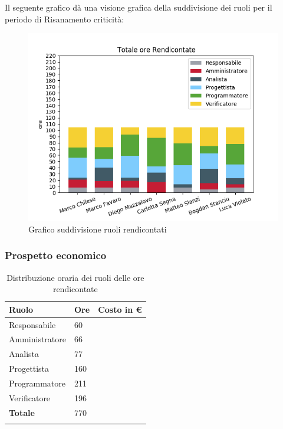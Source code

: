 Il seguente grafico dà una visione grafica della suddivisione dei ruoli per il periodo di Risanamento criticità:%

\begin{figure}[H]
	\centering
  		\includegraphics[width=1\linewidth]{./images/fig_tor.png}
  		\caption{Grafico suddivisione ruoli rendicontati}
  		\label{fig:grafico suddivione ruoli}
\end{figure}


\subsubsection{Prospetto economico}
\begin{longtable}{| C{.30\textwidth}| C{.15\textwidth}| C{.20\textwidth}|}
\hline
\textbf{Ruolo} & \textbf{Ore} & \textbf{Costo in \euro} \\
\hline
Responsabile & 60 &  \\
\hline
Amministratore & 66 &  \\
\hline
Analista & 77 &  \\
\hline
Progettista & 160 & \\
\hline 
Programmatore & 211 &  \\
\hline
Verificatore & 196 &  \\
\hline 
\textbf{Totale} & 770 & \\
\hline

\caption{Distribuzione oraria dei ruoli delle ore rendicontate}
\label{Distribuzione oraria a carico del committente}
\end{longtable}

